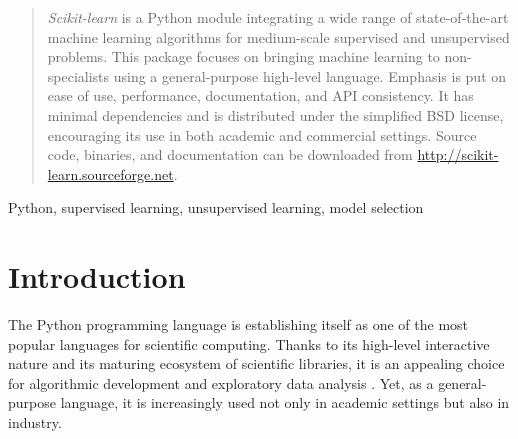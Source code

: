 \documentclass[twoside,11pt]{article}
\begin{document}

\maketitle

\author{%
        \name Matthieu Brucher \email matthieu.brucher@gmail.com \\
        \addr Total SA, CSTJF \\avenue Larribau \\64000 Pau -- France
        \AND
        \name Matthieu Perrot \email matthieu.perrot@cea.fr\\
        \name \'Edouard Duchesnay \email edouard.duchesnay@cea.fr \\
        \addr LNAO \\Neurospin,
      B\^at 145, CEA Saclay \\91191 Gif sur Yvette -- France
}

\alttitle

\begin{abstract}%
\noindent\emph{Scikit-learn} is a Python module integrating a wide range of
state-of-the-art machine learning algorithms for medium-scale supervised
and unsupervised problems. This package focuses on bringing machine
learning to non-specialists using a general-purpose high-level language.
Emphasis is put on ease of use, performance, documentation, and API
consistency.
%
It has minimal dependencies and is distributed under the simplified BSD
license, encouraging its use in both academic and commercial settings.
Source code, binaries, and documentation can be downloaded from
\url{http://scikit-learn.sourceforge.net}.
\end{abstract}

\begin{keywords}
    Python, supervised learning, unsupervised learning, model selection
\end{keywords}

\section{Introduction}

The Python programming language is establishing itself as one of the
most popular languages for scientific computing. Thanks to its
high-level interactive nature and its maturing ecosystem of scientific
libraries, it is an appealing choice for algorithmic development and
exploratory data analysis \citep{cise2007,cise2011}. Yet, as a
general-purpose language, it is increasingly used not only in academic
settings but also in industry.
\end{document}
